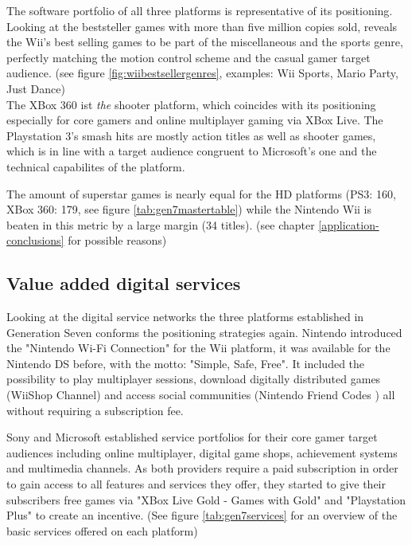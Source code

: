 \documentclass
[
    a4paper,
    11pt
]
{article}
\begin{document}
The software portfolio of all three platforms is representative of its positioning.
Looking at the beststeller games with more than five million copies sold, reveals
the Wii's best selling games to be part of the miscellaneous and the sports genre,
perfectly matching the motion control scheme and the casual gamer target audience.
(see figure \ref{fig:wiibestsellergenres}, examples: Wii Sports, Mario Party, Just Dance) \\
The XBox 360 ist \emph{the} shooter platform, which coincides with its positioning
especially for core gamers and online multiplayer gaming via XBox Live. The Playstation 3's
smash hits are mostly action titles as well as shooter games, which is in line with
a target audience congruent to Microsoft's one and the technical capabilites of the
platform.

The amount of superstar games is nearly equal for the HD platforms (PS3: 160, XBox 360: 179,
see figure \ref{tab:gen7mastertable}) while the Nintendo Wii is beaten in this
metric by a large margin (34 titles). (see chapter \ref{application-conclusions}
for possible reasons)

\subsection{Value added digital services}
\label{application-services}
Looking at the digital service networks the three platforms established in
Generation Seven conforms the positioning strategies again. Nintendo introduced
the "Nintendo Wi-Fi Connection" for the Wii platform, it was available for the
Nintendo DS before, \cite{Nintendo2014} with the motto: "Simple, Safe, Free". \cite{Famitsu2006}
It included the possibility to play multiplayer sessions, download digitally distributed
games (WiiShop Channel\cite{Nintendo2016b}) and access social communities (Nintendo Friend
Codes \cite{Nintendo2014a}) all without requiring a subscription fee.

Sony and Microsoft established service portfolios for their core gamer target audiences
including online multiplayer, digital game shops, achievement systems and multimedia channels.
As both providers require a paid subscription in order to gain access to all
features and services they offer, they started to give their subscribers free
games via "XBox Live Gold - Games with Gold" \cite{XBoxLiveGold2016} and
"Playstation Plus" \cite{PlaystationPlus2016} to create an incentive. (See figure
\ref{tab:gen7services} for an overview of the basic services offered on each platform)
\end{document}
